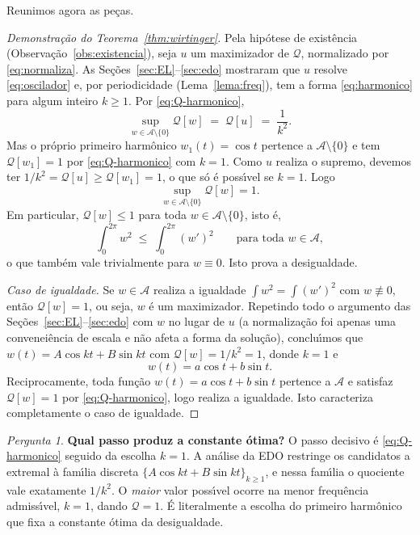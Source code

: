 \documentclass[11pt,a4paper]{amsart}
\newcommand{\Q}{\mathcal{Q}}
\newcommand{\Adm}{\mathcal{A}}
\theoremstyle{plain}
\theoremstyle{definition}
\theoremstyle{remark}
\newtheorem{pergunta}[teorema]{Pergunta}
\begin{document}
Reunimos agora as pe\c{c}as.

\begin{proof}[Demonstra\c{c}\~ao do Teorema~\ref{thm:wirtinger}]
Pela hip\'otese de exist\^encia (Observa\c{c}\~ao~\ref{obs:existencia}), seja
$u$ um maximizador de $\Q$, normalizado por \eqref{eq:normaliza}. As
Se\c{c}\~oes~\ref{sec:EL}--\ref{sec:edo} mostraram que $u$ resolve
\eqref{eq:oscilador} e, por periodicidade (Lema~\ref{lema:freq}), tem a forma
\eqref{eq:harmonico} para algum inteiro $k\ge 1$. Por \eqref{eq:Q-harmonico},
\[
  \sup_{w\in\Adm\setminus\{0\}}\Q[w] \;=\; \Q[u] \;=\; \frac{1}{k^2} .
\]
Mas o pr\'oprio primeiro harm\^onico $w_1(t)=\cos t$ pertence a
$\Adm\setminus\{0\}$ e tem $\Q[w_1]=1$ por \eqref{eq:Q-harmonico} com $k=1$.
Como $u$ realiza o supremo, devemos ter $1/k^2 = \Q[u] \ge \Q[w_1] = 1$, o que
s\'o \'e poss\'\i vel se $k=1$. Logo
\[
  \sup_{w\in\Adm\setminus\{0\}}\Q[w] = 1 .
\]
Em particular, $\Q[w]\le 1$ para toda $w\in\Adm\setminus\{0\}$, isto \'e,
\[
  \int_0^{2\pi} w^2 \;\le\; \int_0^{2\pi} (w')^2
  \qquad\text{para toda }w\in\Adm,
\]
o que tamb\'em vale trivialmente para $w\equiv 0$. Isto prova a desigualdade.

\medskip
\noindent\emph{Caso de igualdade.}\quad
Se $w\in\Adm$ realiza a igualdade $\int w^2=\int(w')^2$ com $w\not\equiv 0$,
ent\~ao $\Q[w]=1$, ou seja, $w$ \'e um maximizador. Repetindo todo o
argumento das Se\c{c}\~oes~\ref{sec:EL}--\ref{sec:edo} com $w$ no lugar de $u$
(a normaliza\c{c}\~ao foi apenas uma convenei\^encia de escala e n\~ao afeta a
forma da solu\c{c}\~ao), conclu\'\i mos que $w(t)=A\cos kt + B\sin kt$ com
$\Q[w]=1/k^2=1$, donde $k=1$ e
\[
  w(t) = a\cos t + b\sin t .
\]
Reciprocamente, toda fun\c{c}\~ao $w(t)=a\cos t+b\sin t$ pertence a $\Adm$ e
satisfaz $\Q[w]=1$ por \eqref{eq:Q-harmonico}, logo realiza a igualdade. Isto
caracteriza completamente o caso de igualdade.
\end{proof}

\begin{pergunta}\label{perg:constante}
\textbf{Qual passo produz a constante \'otima?}
O passo decisivo \'e \eqref{eq:Q-harmonico} seguido da escolha $k=1$. A
an\'alise da EDO restringe os candidatos a extremal \`a fam\'\i lia discreta
$\{A\cos kt + B\sin kt\}_{k\ge1}$, e nessa fam\'\i lia o quociente vale
exatamente $1/k^2$. O \emph{maior} valor poss\'\i vel ocorre na menor
frequ\^encia admiss\'\i vel, $k=1$, dando $\Q=1$. \'E literalmente a
escolha do primeiro harm\^onico que fixa a constante \'otima da
desigualdade.
\end{pergunta}
\end{document}
